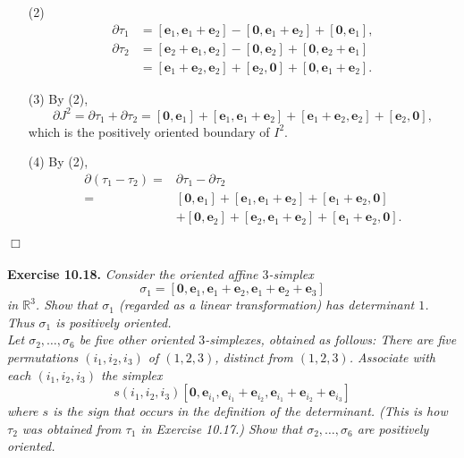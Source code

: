 \documentclass{article}
\begin{document}
\begin{enumerate}
\item[(2)]
  \begin{align*}
    \partial \tau_1
    &= [\mathbf{e}_1, \mathbf{e}_1+\mathbf{e}_2]
      - [\mathbf{0}, \mathbf{e}_1+\mathbf{e}_2]
      + [\mathbf{0}, \mathbf{e}_1], \\
    \partial \tau_2
    &= [\mathbf{e}_2+\mathbf{e}_1, \mathbf{e}_2]
      - [\mathbf{0}, \mathbf{e}_2]
      + [\mathbf{0}, \mathbf{e}_2+\mathbf{e}_1] \\
    &= [\mathbf{e}_1+\mathbf{e}_2, \mathbf{e}_2]
      + [\mathbf{e}_2, \mathbf{0}]
      + [\mathbf{0}, \mathbf{e}_1+\mathbf{e}_2].
  \end{align*}

\item[(3)]
  By (2),
  \[
    \partial J^2
    = \partial \tau_1 + \partial \tau_2
    = [\mathbf{0}, \mathbf{e}_1]
      + [\mathbf{e}_1, \mathbf{e}_1+\mathbf{e}_2]
      + [\mathbf{e}_1+\mathbf{e}_2, \mathbf{e}_2]
      + [\mathbf{e}_2, \mathbf{0}],
  \]
  which is the positively oriented boundary of $I^2$.

\item[(4)]
  By (2),
  \begin{align*}
    \partial(\tau_1 - \tau_2)
    =& \partial \tau_1 - \partial \tau_2 \\
    =& [\mathbf{0}, \mathbf{e}_1]
      + [\mathbf{e}_1, \mathbf{e}_1+\mathbf{e}_2]
      + [\mathbf{e}_1+\mathbf{e}_2, \mathbf{0}] \\
      &+ [\mathbf{0}, \mathbf{e}_2]
      + [\mathbf{e}_2, \mathbf{e}_1+\mathbf{e}_2]
      + [\mathbf{e}_1+\mathbf{e}_2, \mathbf{0}].
  \end{align*}
\end{enumerate}
$\Box$ \\\\






\textbf{Exercise 10.18.}
\emph{Consider the oriented affine $3$-simplex
\[
  \sigma_1
  = [\mathbf{0}, \mathbf{e}_1, \mathbf{e}_1+\mathbf{e}_2, \mathbf{e}_1+\mathbf{e}_2+\mathbf{e}_3]
\]
in $\mathbb{R}^3$.
Show that $\sigma_1$ (regarded as a linear transformation) has determinant $1$.
Thus $\sigma_1$ is positively oriented.} \\

\emph{Let $\sigma_2, \ldots, \sigma_6$ be five other oriented $3$-simplexes,
obtained as follows:
There are five permutations $(i_1, i_2, i_3)$ of $(1, 2, 3)$,
distinct from $(1, 2, 3)$.
Associate with each $(i_1, i_2, i_3)$ the simplex
\[
  s(i_1, i_2, i_3)
  [
    \mathbf{0},
    \mathbf{e}_{i_1},
    \mathbf{e}_{i_1}+\mathbf{e}_{i_2},
    \mathbf{e}_{i_1}+\mathbf{e}_{i_2}+\mathbf{e}_{i_3}
  ]
\]
where $s$ is the sign that occurs in the definition of the determinant.
(This is how $\tau_2$ was obtained from $\tau_1$ in Exercise 10.17.)
Show that $\sigma_2, \ldots, \sigma_6$ are positively oriented.} \\
\end{document}
